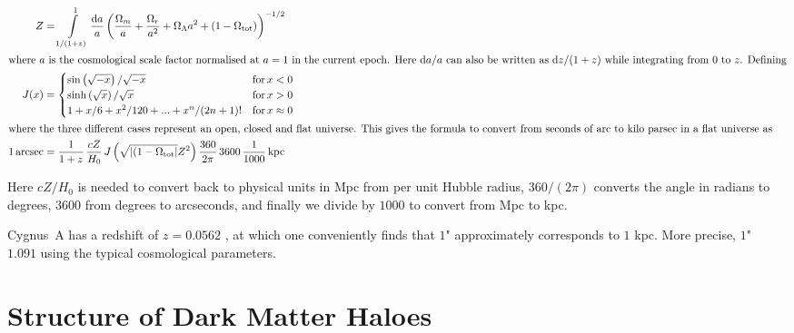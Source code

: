 \documentclass[MScProj_TLRH_ClusterEnergy.tex]{subfiles}
\begin{document}
\begin{align}
    Z &= \int\limits_{1/(1+z)}^{1} \frac{\mathrm{d}a}{a} 
    \left( \frac{\Omega_m}{a} + \frac{\Omega_r}{a^2} 
+ \Omega_{\Lambda}a^2 + (1-\Omega_{\text{tot}}) \right)^{-1/2} \\
\intertext{where $a$ is the cosmological scale factor normalised at $a=1$ in the current
epoch. Here $\mathrm{d}a/a$ can also be written as $\mathrm{d}z/(1+z)$ while integrating from 
$0$ to $z$. Defining}
J(x) &= \begin{cases}
            \sin\left(\sqrt{-x}\right)/\sqrt{-x} & \text{for} \, x<0 \\
            \sinh \left(\sqrt{x}\right)/\sqrt{x} & \text{for} \, x > 0\\
            1 + x/6 + x^2/120 + ... + x^n/(2n+1)! & \text{for} \, x \approx 0
        \end{cases}\\
\intertext{where the three different cases represent an open, closed and flat universe.
           This gives the formula to convert from seconds of arc to kilo parsec
           in a flat universe as}
        1 \, \text{arcsec} &= \frac{1}{1+z} \, \frac{cZ}{H_0} \,
           J\left(\sqrt{|(1-\Omega_{\text{tot}}|} Z^2\right) 
           \frac{360}{2 \pi} \, 3600 \, \frac{1}{1000} \, \text{kpc} \label{eq:arcsec2kpc}
\end{align}

Here $cZ/H_0$ is needed to convert back to physical units in Mpc from per unit
Hubble radius, $360/(2\pi)$ converts the angle in radians to degrees, $3600$ from
degrees to arcseconds, and finally we divide by $1000$ to convert from Mpc to kpc.

Cygnus~A has a redshift of $z=0.0562$ \citep{1997ApJ...488L..15O}, at which
one conveniently finds that $1$" approximately corresponds to $1$ kpc. More 
precise, $1$" \mytilde \, $1.091$ using the typical cosmological parameters. \\



\section{Structure of Dark Matter Haloes}
\label{sec:darkmatter}
\end{document}
